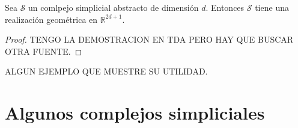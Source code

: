 \begin{lema}
	Sea $\mathcal{S}$ un comlpejo simplicial abstracto de dimensión $d$. Entonces $\mathcal{S}$ tiene 
	una realización geométrica en $\mathbb{R}^{2d+1}$.
\end{lema}
\begin{proof}
	TENGO LA DEMOSTRACION EN TDA PERO HAY QUE BUSCAR OTRA FUENTE.
\end{proof}

\begin{ejemplo}
	ALGUN EJEMPLO QUE MUESTRE SU UTILIDAD.
\end{ejemplo}

\section{Algunos complejos simpliciales}

\endinput
